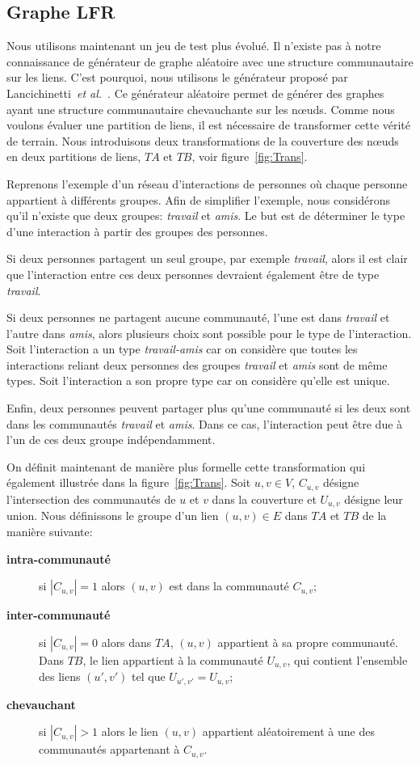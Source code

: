 \subsection{Graphe LFR}

Nous utilisons maintenant un jeu de test plus évolué.
Il n'existe pas à notre connaissance de générateur de graphe aléatoire avec une structure communautaire sur les liens.
C'est pourquoi, nous utilisons le générateur proposé par Lancichinetti~\textit{et al.}~\cite{Lancichinetti2009b}.
Ce générateur aléatoire permet de générer des graphes ayant une structure communautaire chevauchante sur les n\oe uds.
Comme nous voulons évaluer une partition de liens, il est nécessaire de transformer cette vérité de terrain.
Nous introduisons deux transformations de la couverture des n\oe uds en deux partitions de liens, $TA$ et $TB$, voir figure~\ref{fig:Trans}.


Reprenons l'exemple d'un réseau d'interactions de personnes où chaque personne appartient à différents groupes.
Afin de simplifier l'exemple, nous considérons qu'il n'existe que deux groupes: \emph{travail} et \emph{amis}.
Le but est de déterminer le type d'une interaction à partir des groupes des personnes.

Si deux personnes partagent un seul groupe, par exemple \emph{travail}, alors il est clair que l'interaction entre ces deux personnes devraient également être de type \emph{travail}.

Si deux personnes ne partagent aucune communauté, l'une est dans \emph{travail} et l'autre dans \emph{amis}, alors plusieurs choix sont possible pour le type de l'interaction.
Soit l'interaction a un type \emph{travail-amis} car on considère que toutes les interactions reliant deux personnes des groupes \emph{travail} et \emph{amis} sont de même types.
Soit l'interaction a son propre type car on considère qu'elle est unique.

Enfin, deux personnes peuvent partager plus qu'une communauté si les deux sont dans les communautés \emph{travail} et \emph{amis}.
Dans ce cas, l'interaction peut être due à l'un de ces deux groupe indépendamment.

On définit maintenant de manière plus formelle cette transformation qui également illustrée dans la figure~\ref{fig:Trans}.
Soit $u,v \in V$, $C_{u,v}$ désigne l'intersection des communautés de $u$ et $v$ dans la couverture et $U_{u,v}$ désigne leur union.
Nous définissons le groupe d'un lien $(u,v) \in E$ dans $TA$ et $TB$ de la manière suivante:
\begin{description}
\item[\textbf{intra-communauté}] si $|C_{u,v}| = 1$ alors $(u,v)$ est dans la communauté $C_{u,v}$;
\item[\textbf{inter-communauté}] si $|C_{u,v}| = 0$ alors dans $TA$, $(u,v)$ appartient à sa propre communauté.
Dans $TB$, le lien appartient à la communauté $U_{u,v}$, qui contient l'ensemble des liens $(u',v')$ tel que $U_{u',v'}=U_{u,v}$;
\item[\textbf{chevauchant}] si $|C_{u,v}| > 1$ alors le lien $(u,v)$ appartient aléatoirement à une des communautés appartenant à $C_{u,v}$.
\end{description}

